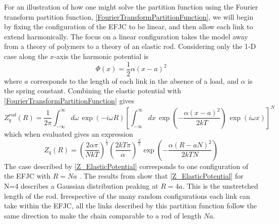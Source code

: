 For an illustration of how one might solve the partition function using the Fourier transform partition function, \eqref{FourierTransformPartitionFunction}, we will begin by fixing the configuration of the EFJC to be linear, and then allow each link to extend harmonically. The focus on a linear configuration takes the model away from a theory of polymers to a theory of an elastic rod. Considering only the 1-D case along the $x$-axis the harmonic
potential is
%
\begin{equation}
\Phi\left(x\right)=\frac{1}{2}\alpha\left(x-a\right)^{2}\label{ElasticPotential}
\end{equation}
%
where $a$ corresponds to the length of each link in the absence of a load, and $\alpha$ is the spring constant. Combining the elastic
potential with \eqref{FourierTransformPartitionFunction} gives
%
\begin{equation}
Z_{q}^{rod}\left(R\right)=\frac{1}{2\pi}\int_{-\infty}^{\infty}d\omega\, \exp\left(-i\omega R\right)\left[\int_{-\infty}^{\infty}dx\, \exp\left(-\frac{\alpha\left(x-a\right)^{2}}{2kT}\right)\, \exp\left(i\omega x\right)\right]^{N}
\end{equation}
%
which when evaluated gives an expression
%
\begin{equation}
Z_{q}\left(R\right)=\left(\frac{2\alpha\pi}{NkT}\right)^{\frac{1}{2}}\left(\frac{2kT\pi}{\alpha}\right)^{\frac{N}{2}}\exp\left(-\frac{\alpha\left(R-aN\right)^{2}}{2kTN}\right)\label{Z_ElasticPotential}
\end{equation}
%
The case described by \eqref{Z_ElasticPotential} corresponds to one configuration of the EFJC with $R=Na$ .
The results from  show that \eqref{Z_ElasticPotential} for N=4 describes a Gaussian distribution peaking at $R=4a$. This is the unstretched length of the rod. Irrespective of the many random configurations each link can take within the EFJC, all the links described by this partition function follow the same direction to make the chain comparable to a rod of length $Na$. 

